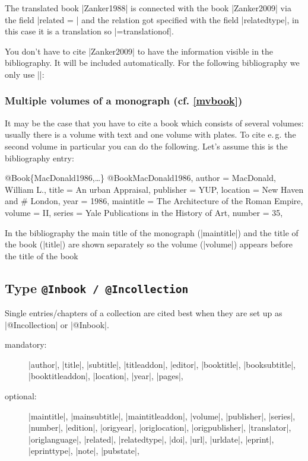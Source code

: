 \documentclass[a4paper,
10pt,
greek,
french,
spanish,
italian,
ngerman,
english
]{ltxdoc}
\begin{document}
The translated book |Zanker1988| is connected with the book |Zanker2009| via the field |related = | 
and the relation got specified with the field |relatedtype|, in this case it is a translation so |={translationof}|.

You don't have to cite |Zanker2009| to have the information visible in the bibliography. 
It will be included automatically. For the following bibliography we only use |\cite{Zanker1988}|:



\subsubsection{Multiple volumes of a monograph (cf. \cref{mvbook})}
It may be the case that you have to cite a book which consists of several volumes:
usually there is a volume with text and one volume with plates.
To cite  e.\,g. the second volume in particular you can do the following.
Let’s assume this is the bibliography entry:
\begin{bibexample}[label=MacDonald1986]{{@}Book\{MacDonald1986,…\}}
@Book{MacDonald1986,
  author    = {MacDonald, William L.},
  title     = {An urban Appraisal},
  publisher = YUP,    %
  location  = {New Haven and }# London, %
  year      = {1986},
  maintitle = {The Architecture of the Roman Empire},
  volume    = {II},
  series    = {Yale Publications in the History of Art},
  number    = {35},
}
\end{bibexample}
In the bibliography the main title of the monograph (|maintitle|)
and the title of the book (|title|) are shown separately  so the volume  (|volume|) 
appears before the title of the book


\subsection{Type \texttt{@Inbook / @Incollection}}\label{inbook}
Single entries/chapters of a collection are cited best when they are set up as  |@Incollection| or |@Inbook|.

\begin{description}
\item[mandatory:] 
|author|, |title|, |subtitle|, |titleaddon|,
|editor|,  |booktitle|, |booksubtitle|, |booktitleaddon|,
|location|, |year|, |pages|, 
\item[optional:]
|maintitle|, |mainsubtitle|, |maintitleaddon|, |volume|, 
|publisher|, |series|, |number|, |edition|, 
|origyear|, |origlocation|, |origpublisher|, 
|translator|, |origlanguage|,
|related|, |relatedtype|,
|doi|, |url|, |urldate|, |eprint|, |eprinttype|, |note|, |pubstate|, 
 \end{description}
 
\end{document}
